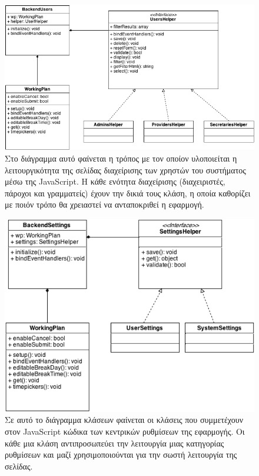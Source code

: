 \begin{figure}[H]
\centering
\includegraphics[width=150mm]{images/cd-backend-users.png}
\caption{Στο διάγραμμα αυτό φαίνεται η τρόπος με τον οποίον υλοποιείται η λειτουργικότητα της σελίδας διαχείρισης των χρηστών του συστήματος μέσω της JavaScript. Η κάθε ενότητα διαχείρισης (διαχειριστές, πάροχοι και γραμματείς) έχουν την δικιά τους κλάση, η οποία καθορίζει με ποιόν τρόπο θα χρειαστεί να ανταποκριθεί η εφαρμογή.}
\label{cd-backend-users}
\end{figure}

\begin{figure}[H]
\centering
\includegraphics[width=150mm]{images/cd-backend-settings.png}
\caption{Σε αυτό το διάγραμμα κλάσεων φαίνεται οι κλάσεις που συμμετέχουν στον JavaScript κώδικα των κεντρικών ρυθμίσεων της εφαρμογής. Οι κάθε μια κλάση αντιπροσωπεύει την λειτουργία μιας κατηγορίας ρυθμίσεων και μαζί χρησιμοποιούνται για την σωστή λειτουργία της σελίδας.}
\label{cd-backend-settings}
\end{figure}
